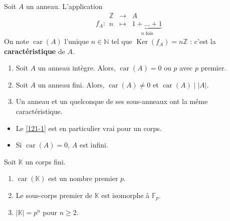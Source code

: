 
  \begin{definition}
    Soit $A$ un anneau. L'application
    \[
      f_A :
      \begin{array}{ccc}
        \mathbb{Z} &\rightarrow& A \\
        n &\mapsto& \underbrace{1 + \dots + 1}_{n \text{ fois}}
      \end{array}
    \]
    On note $\operatorname{car}(A)$ l'unique $n \in \mathbb{N}$ tel que $\operatorname{Ker}(f_A) = n\mathbb{Z}$ : c'est la \textbf{caractéristique} de $A$.
  \end{definition}

  \begin{proposition}
    \begin{enumerate}[label=(\roman*)]
      \item \label{121-1} Soit $A$ un anneau intègre. Alors, $\operatorname{car}(A) = 0 \text{ ou } p$ avec $p$ premier.
      \item Soit $A$ un anneau fini. Alors, $\operatorname{car}(A) \neq 0$ et $\operatorname{car}(A) \mid |A|$.
      \item Un anneau et un quelconque de ses sous-anneaux ont la même caractéristique.
    \end{enumerate}
  \end{proposition}

  \begin{remark}
    \begin{itemize}
      \item Le \cref{121-1} est en particulier vrai pour un corps.
      \item Si $\operatorname{car}(A) = 0$, $A$ est infini.
    \end{itemize}
  \end{remark}


  \begin{proposition}
    Soit $\mathbb{K}$ un corps fini.
    \begin{enumerate}[label=(\roman*)]
      \item $\operatorname{car}(\mathbb{K})$ est un nombre premier $p$.
      \item Le sous-corps premier de $\mathbb{K}$ est isomorphe à $\mathbb{F}_p$.
      \item $\vert \mathbb{K} \vert = p^n$ pour $n \geq 2$.
    \end{enumerate}
  \end{proposition}

